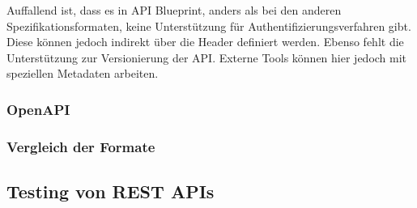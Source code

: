 Auffallend ist, dass es in API Blueprint, anders als bei den anderen Spezifikationsformaten, keine Unterstützung für Authentifizierungsverfahren gibt. Diese können jedoch indirekt über die Header definiert werden. Ebenso fehlt die Unterstützung zur Versionierung der API. Externe Tools können hier jedoch mit speziellen Metadaten arbeiten.

\subsubsection{OpenAPI}

\subsubsection{Vergleich der Formate}

\subsection{Testing von REST APIs}
